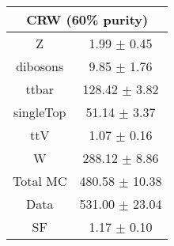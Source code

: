 \begin{tabular}{c|c}
\hline\hline
\multicolumn{2}{c}{\bf CRW (60\% purity)} \\ \hline 
Z & 1.99 $\pm$ 0.45 \\
dibosons & 9.85 $\pm$ 1.76 \\
ttbar & 128.42 $\pm$ 3.82 \\
singleTop & 51.14 $\pm$ 3.37 \\
ttV & 1.07 $\pm$ 0.16 \\
W & 288.12 $\pm$ 8.86 \\
\hline
Total MC & 480.58 $\pm$ 10.38 \\
Data & 531.00 $\pm$ 23.04 \\
 \hline
SF & 1.17 $\pm$ 0.10 \\
\hline\hline
\end{tabular}
